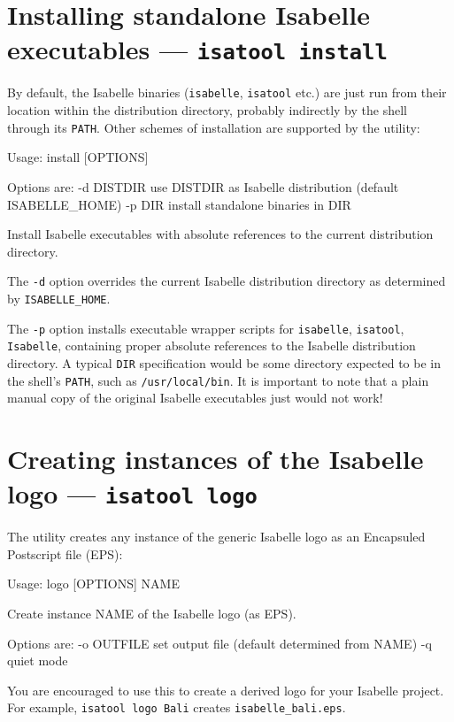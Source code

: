 \section{Installing standalone Isabelle executables --- \texttt{isatool install}}
\label{sec:tool-install}

By default, the Isabelle binaries (\texttt{isabelle}, \texttt{isatool} etc.)
are just run from their location within the distribution directory, probably
indirectly by the shell through its \texttt{PATH}.  Other schemes of
installation are supported by the  utility:
\begin{ttbox}
Usage: install [OPTIONS]

  Options are:
    -d DISTDIR   use DISTDIR as Isabelle distribution
                 (default ISABELLE_HOME)
    -p DIR       install standalone binaries in DIR

  Install Isabelle executables with absolute references to the current
  distribution directory.
\end{ttbox}

The \texttt{-d} option overrides the current Isabelle distribution directory
as determined by \texttt{ISABELLE_HOME}.

The \texttt{-p} option installs executable wrapper scripts for
\texttt{isabelle}, \texttt{isatool}, \texttt{Isabelle}, containing proper
absolute references to the Isabelle distribution directory.  A typical
\texttt{DIR} specification would be some directory expected to be in the
shell's \texttt{PATH}, such as \texttt{/usr/local/bin}.  It is important to
note that a plain manual copy of the original Isabelle executables just would
not work!


\section{Creating instances of the Isabelle logo --- \texttt{isatool
    logo}}

The  utility creates any instance of the generic Isabelle logo as
an Encapsuled Postscript file (EPS):
\begin{ttbox}
Usage: logo [OPTIONS] NAME

  Create instance NAME of the Isabelle logo (as EPS).

  Options are:
    -o OUTFILE   set output file (default determined from NAME)
    -q           quiet mode
\end{ttbox}
You are encouraged to use this to create a derived logo for your Isabelle
project.  For example, \texttt{isatool logo Bali} creates
\texttt{isabelle_bali.eps}.


